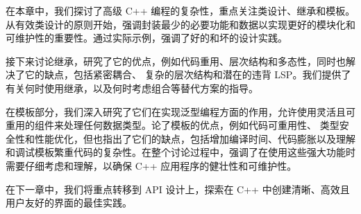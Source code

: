 在本章中，我们探讨了高级 C++ 编程的复杂性，重点关注类设计、继承和模板。从有效类设计的原则开始，强调封装最少的必要功能和数据以实现更好的模块化和可维护性的重要性。通过实际示例，强调了好的和坏的设计实践。

接下来讨论继承，研究了它的优点，例如代码重用、层次结构和多态性，同时也解决了它的缺点，包括紧密耦合、 复杂的层次结构和潜在的违背 LSP。我们提供了有关何时使用继承，以及何时考虑组合等替代方案的指导。

在模板部分，我们深入研究了它们在实现泛型编程方面的作用，允许使用灵活且可重用的组件来处理任何数据类型。论了模板的优点，例如代码可重用性、 类型安全性和性能优化，但也指出了它们的缺点，包括增加编译时间、代码膨胀以及理解和调试模板繁重代码的复杂性。在整个讨论过程中，强调了在使用这些强大功能时需要仔细考虑和理解，以确保 C++ 应用程序的健壮性和可维护性。

在下一章中，我们将重点转移到 API 设计上，探索在 C++ 中创建清晰、高效且用户友好的界面的最佳实践。
